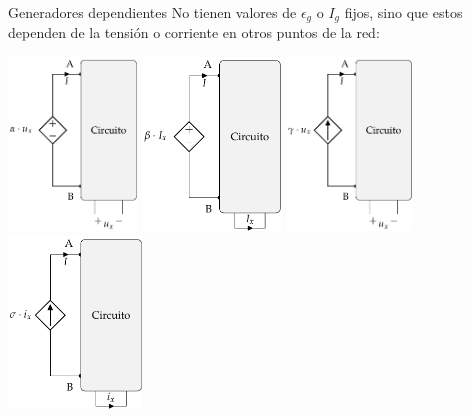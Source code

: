 \documentclass[aspectratio=169, xcolor={usenames,svgnames,dvipsnames}]{beamer}
\begin{document}

\begin{frame}{Generadores dependientes} \label{diapo:fuentes_dependientes}
    No tienen valores de $\epsilon_g$ o $I_g$ fijos, sino que estos \alert{dependen de la tensión o corriente en otros puntos de la red}:
	\begin{center}
		\includegraphics[height=4.6cm]{../figs/FuenteTensionDependienteTension.pdf}\label{fig.tension-tension}\hfill
		\includegraphics[height=4.6cm]{../figs/FuenteTensionDependienteCorriente.pdf}\label{fig.tension-corriente}\hfill
		\includegraphics[height=4.6cm]{../figs/FuenteCorrienteDependienteTension.pdf}\label{fig.corriente-tension}\hfill
		\includegraphics[height=4.6cm]{../figs/FuenteCorrienteDependienteCorriente.pdf}\label{fig.corriente-corriente}
	\end{center}
\end{frame}
\end{document}
